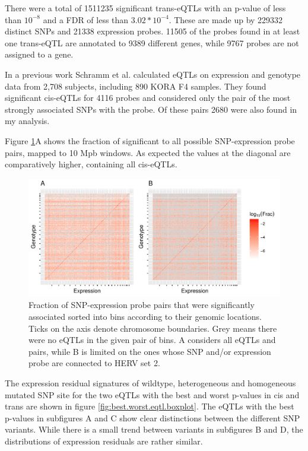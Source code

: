 \documentclass[a4paper,12pt,twoside,openright]{report}
\begin{document}
There were a total of 1511235 significant trans-eQTLs with an p-value of less than $10^{-8}$ and a FDR of less than $3.02*10^{-4}$. These are made up by 229332 distinct SNPs and 21338 expression probes. 11505 of the probes found in at least one trans-eQTL are annotated to 9389 different genes, while 9767 probes are not assigned to a gene.

In a previous work Schramm et al. \cite{10.1371/journal.pone.0093844} calculated eQTLs on expression and genotype data from 2,708 subjects, including 890 KORA F4 samples. They found significant cis-eQTLs for 4116 probes and considered only the pair of the most strongly associated SNPs with the probe. Of these pairs 2680 were also found in my analysis. 

Figure \ref{fig:global.eqtl.heatmap}A shows the fraction of significant to all possible  SNP-expression probe pairs, mapped to 10 Mpb windows. As expected the values at the diagonal are comparatively higher, containing all cis-eQTLs. 

\begin{figure}[tb]
	\includegraphics[scale = 1, keepaspectratio = true]{../figures/eqtl_all_herv_heatmap}  
	\caption{Fraction of SNP-expression probe pairs that were significantly associated sorted into bins according to their genomic locations. Ticks on the axis denote chromosome boundaries. Grey means there were no eQTLs in the given pair of bins. A considers all eQTLs and pairs, while B is limited on the ones whose SNP and/or expression probe are connected to HERV set 2.}
    \label{fig:global.eqtl.heatmap}
\end{figure}

The expression residual signatures of wildtype, heterogeneous and homogeneous mutated SNP site for the two eQTLs with the best and worst p-values in cis and trans are shown in figure \ref{fig:best.worst.eqtl.boxplot}. The eQTLs with the best p-values in subfigures A and C show clear distinctions between the different SNP variants. While there is a small trend between variants in subfigures B and D, the distributions of expression residuals are rather similar.    
\end{document}
